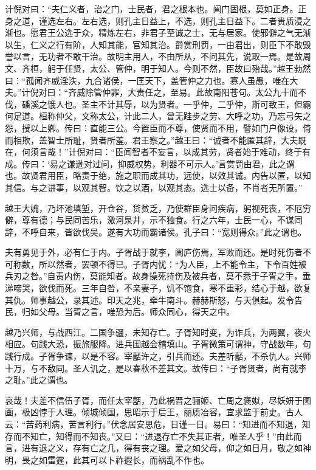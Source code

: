 \documentclass[12pt,UTF8]{ctexbook}
\begin{document}
计倪对曰：“夫仁义者，治之门，士民者，君之根本也。闿门固根，莫如正身。正身之道，谨选左右。左右选，则孔主日益上，不选，则孔主日益下。二者贵质浸之渐也。愿君王公选于众，精炼左右，非君子至诚之士，无与居家。使邪僻之气无渐以生，仁义之行有阶，人知其能，官知其治。爵赏刑罚，一由君出，则臣下不敢毁誉以言，无功者不敢干治。故明主用人，不由所从，不问其先，说取一焉。是故周文、齐桓，躬于任贤，太公、管仲，明于知人。今则不然，臣故曰殆哉。”越王勃然曰：“孤闻齐威淫泆，九合诸侯，一匡天下，盖管仲之力也。寡人虽愚，唯在大夫。”计倪对曰：“齐威除管仲罪，大责任之，至易。此故南阳苍句。太公九十而不伐，磻溪之饿人也。圣主不计其辱，以为贤者。一乎仲，二乎仲，斯可致王，但霸何足道。桓称仲父，文称太公，计此二人，曾无跬步之劳、大呼之功，乃忘弓矢之怨，授以上卿。传曰：直能三公。今置臣而不尊，使贤而不用，譬如门户像设，倚而相欺，盖智士所耻，贤者所羞。君王察之。”越王曰：“诚者不能匿其辞，大夫既在，何须言哉！”计倪对曰：“臣闻智者不妄言，以成其劳，贤者始于难动，终于有成。传曰：‘易之谦逊对过问，抑威权势，利器不可示人。’言赏罚由君，此之谓也。故贤君用臣，略责于绝，施之职而成其功，远使，以效其诚。内告以匿，以知其信。与之讲事，以观其智。饮之以酒，以观其态。选士以备，不肖者无所置。”

越王大媿，乃坏池填堑，开仓谷，贷贫乏，乃使群臣身问疾病，躬视死丧，不厄穷僻，尊有德；与民同苦乐，激河泉井，示不独食。行之六年，士民一心，不谋同辞，不呼自来，皆欲伐吴。遂有大功而霸诸侯。孔子曰：“宽则得众。”此之谓也。

夫有勇见于外，必有仁于内。子胥战于就李，阖庐伤焉，军败而还。是时死伤者不可称数，所以然者，罢顿不得已。子胥内忧：“为人臣，上不能令主，下令百姓被兵刃之咎。”自责内伤，莫能知者。故身操死持伤及被兵者，莫不悉于子胥之手，垂涕啼哭，欲伐而死。三年自咎，不亲妻子，饥不饱食，寒不重彩，结心于越，欲复其仇。师事越公，录其述。印天之兆，牵牛南斗。赫赫斯怒，与天俱起。发令告民，归如父母。当胥之言，唯恐为后。师众同心，得天之中。

越乃兴师，与战西江。二国争疆，未知存亡。子胥知时变，为诈兵，为两翼，夜火相应。句践大恐，振旅服降。进兵围越会稽填山。子胥微策可谓神，守战数年，句践行成。子胥争谏，以是不容。宰嚭许之，引兵而还。夫差听嚭，不杀仇人。兴师十万，与不敌同。圣人讥之，是以春秋不差其文。故传曰：“子胥贤者，尚有就李之耻。”此之谓也。

哀哉！夫差不信伍子胥，而任太宰嚭，乃此祸晋之骊姬、亡周之褒姒，尽妖妍于图画，极凶悖于人理。倾城倾国，思昭示于后王，丽质冶容，宜求监于前史。古人云：“苦药利病，苦言利行。”伏念居安思危，日谨一日。易曰：“知进而不知退，知存而不知亡，知得而不知丧。”又曰：“进退存亡不失其正者，唯圣人乎！”由此而言，进有退之义，存有亡之几，得有丧之理。爱之如父母，仰之如日月，敬之如神明，畏之如雷霆，此其可以卜祚遐长，而祸乱不作也。
\end{document}
